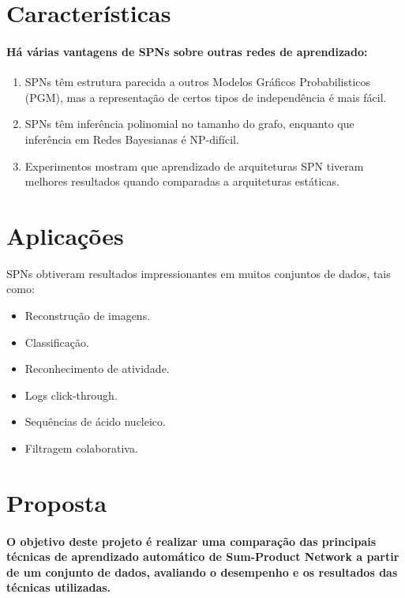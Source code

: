 \documentclass[a4paper,10pt]{article}
\theoremstyle{plain}
\begin{document}
\section{Características}

\paragraph{
  Há várias vantagens de SPNs sobre outras redes de aprendizado:
}

\begin{enumerate} \itemsep0pt
  \item SPNs têm estrutura parecida a outros Modelos Gráficos Probabilisticos (PGM), mas a 
    representação de certos tipos de independência é mais fácil.
  \item SPNs têm inferência polinomial no tamanho do grafo, enquanto que inferência em Redes Bayesianas
    é NP-difícil.
  \item Experimentos mostram que aprendizado de arquiteturas SPN tiveram melhores resultados quando
    comparadas a arquiteturas estáticas.\cite{clustering}
\end{enumerate}

\newpage

\section{Aplicações}

SPNs obtiveram resultados impressionantes em muitos conjuntos de dados\cite{website:spn-uwashington}, tais como:

\begin{itemize} \itemsep0pt
  \item Reconstrução de imagens.
  \item Classificação.
  \item Reconhecimento de atividade.
  \item Logs click-through.
  \item Sequências de ácido nucleico.
  \item Filtragem colaborativa.
\end{itemize}

\section{Proposta}

\paragraph{
  O objetivo deste projeto é realizar uma comparação das principais técnicas de aprendizado 
automático de Sum-Product Network a partir de um conjunto de dados, avaliando o desempenho 
e os resultados das técnicas utilizadas.
}
\end{document}
